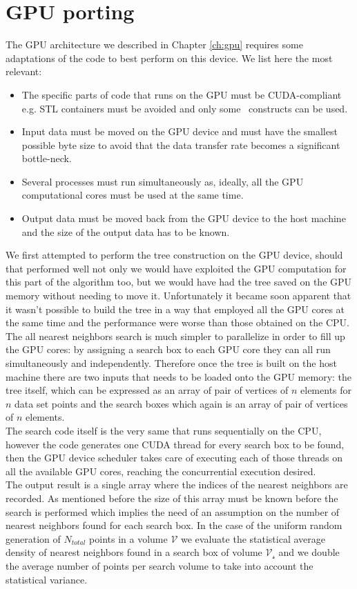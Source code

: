 \section{GPU porting}
The GPU architecture we described in Chapter \ref{ch:gpu} requires some adaptations of the code to best perform on this device. We list here the most relevant:
\begin{itemize}
\item The specific parts of code that runs on the GPU must be CUDA-compliant e.g. STL containers must be avoided and only some \CC\ constructs can be used.
\item Input data must be moved on the GPU device and must have the smallest possible byte size to avoid that the data transfer rate becomes a significant bottle-neck.
\item Several processes must run simultaneously as, ideally, all the GPU computational cores must be used at the same time.
\item Output data must be moved back from the GPU device to the host machine and the size of the output data has to be known.
\end{itemize}
We first attempted to perform the tree construction on the GPU device, should that performed well not only we would have exploited the GPU computation for this part of the algorithm too, but we would have had the tree saved on the GPU memory without needing to move it. Unfortunately it became soon apparent that it wasn't possible to build the tree in a way that employed all the GPU cores at the same time and the performance were worse than those obtained on the CPU.\\
The all nearest neighbors search is much simpler to parallelize in order to fill up the GPU cores: by assigning a search box to each GPU core they can all run simultaneously and independently. Therefore once the tree is built on the host machine there are two inputs that needs to be loaded onto the GPU memory: the tree itself, which can be expressed as an array of pair of vertices of $n$ elements for $n$ data set points and the search boxes which again is an array of pair of vertices of $n$ elements.\\
The search code itself is the very same that runs sequentially on the CPU, however the code generates one CUDA thread for every search box to be found, then the GPU device scheduler takes care of executing each of those threads on all the available GPU cores, reaching the concurrential execution desired.\\
The output result is a single array where the indices of the nearest neighbors are recorded. As mentioned before the size of this array must be known before the search is performed which implies the need of an assumption on the number of nearest neighbors found for each search box. In the case of the uniform random generation of $N_{total}$ points in a volume $\mathcal{V}$ we evaluate the statistical average density of nearest neighbors found in a search box of volume $\mathcal{V_s}$ and we double the average number of points per search volume to take into account the statistical variance.
